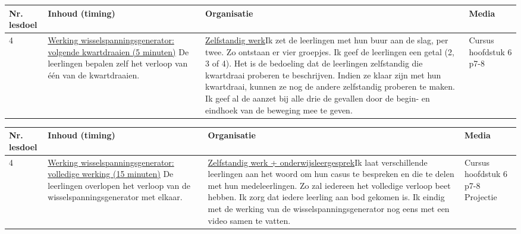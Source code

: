 \begin{landscape}
\begin{tabularx}{1.56\textwidth}{|p{1.5cm}|p{8cm}|X|p{4cm}|}
	\hline
	\textbf{Nr. lesdoel } & \textbf{Inhoud (timing)}  & \textbf{Organisatie } & \textbf{Media } \\ \hline
	4& \underline{Werking wisselspanningsgenerator:} \underline{volgende kwartdraaien (5 minuten)}\newline
	De leerlingen bepalen zelf het verloop van één van de kwartdraaien. 
	&  \underline{Zelfstandig werk}\newline  Ik zet de leerlingen met hun buur aan de slag, per twee. Zo ontstaan er vier groepjes. Ik geef de leerlingen een getal (2, 3 of 4). Het is de bedoeling dat de leerlingen zelfstandig die kwartdraai proberen te beschrijven. Indien ze klaar zijn met hun kwartdraai, kunnen ze nog de andere zelfstandig proberen te maken. Ik geef al de aanzet bij alle drie de gevallen door de begin- en eindhoek van de beweging mee te geven.
	&  Cursus hoofdstuk 6 p7-8
	\\ \hline
\end{tabularx}\vspace{5mm}


\begin{tabularx}{1.56\textwidth}{|p{1.5cm}|p{8cm}|X|p{4cm}|}
	\hline
	\textbf{Nr. lesdoel } & \textbf{Inhoud (timing)}  & \textbf{Organisatie } & \textbf{Media } \\ \hline
	4& \underline{Werking wisselspanningsgenerator:} \underline{volledige werking (15 minuten)}\newline
	De leerlingen overlopen het verloop van de wisselspanningsgenerator met elkaar. 
	&  \underline{Zelfstandig werk + onderwijsleergesprek}\newline  Ik laat verschillende leerlingen aan het woord om hun casus te bespreken en die te delen met hun medeleerlingen. Zo zal iedereen het volledige verloop beet hebben. Ik zorg dat iedere leerling aan bod gekomen is. Ik eindig met de werking van de wisselspanningsgenerator nog eens met een video samen te vatten.
	&  Cursus hoofdstuk 6 p7-8 \newline\newline Projectie
	\\ \hline
\end{tabularx}\vspace{5mm}




\end{landscape}
